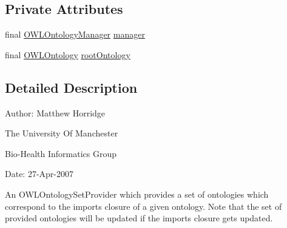 \subsection*{Private Attributes}
\begin{DoxyCompactItemize}
\item 
final \hyperlink{interfaceorg_1_1semanticweb_1_1owlapi_1_1model_1_1_o_w_l_ontology_manager}{O\-W\-L\-Ontology\-Manager} \hyperlink{classorg_1_1semanticweb_1_1owlapi_1_1util_1_1_o_w_l_ontology_imports_closure_set_provider_a7c67738303fa5ecfad7bc8e4453ace31}{manager}
\item 
final \hyperlink{interfaceorg_1_1semanticweb_1_1owlapi_1_1model_1_1_o_w_l_ontology}{O\-W\-L\-Ontology} \hyperlink{classorg_1_1semanticweb_1_1owlapi_1_1util_1_1_o_w_l_ontology_imports_closure_set_provider_ae8ead5c763d1a12663824ad7786f3b82}{root\-Ontology}
\end{DoxyCompactItemize}


\subsection{Detailed Description}
Author\-: Matthew Horridge\par
 The University Of Manchester\par
 Bio-\/\-Health Informatics Group\par
 Date\-: 27-\/\-Apr-\/2007\par
\par
 

An {\ttfamily O\-W\-L\-Ontology\-Set\-Provider} which provides a set of ontologies which correspond to the imports closure of a given ontology. Note that the set of provided ontologies will be updated if the imports closure gets updated. 

